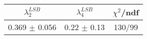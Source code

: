 \begin{tabular}{c|c||c}
$\lambda_{2}^{LSB}$ & $\lambda_4^{LSB}$ & $\chi^{2}$/ndf \\
\hline
0.369 $\pm$ 0.056 & 0.22 $\pm$ 0.13 & 130/99\\
\end{tabular}

